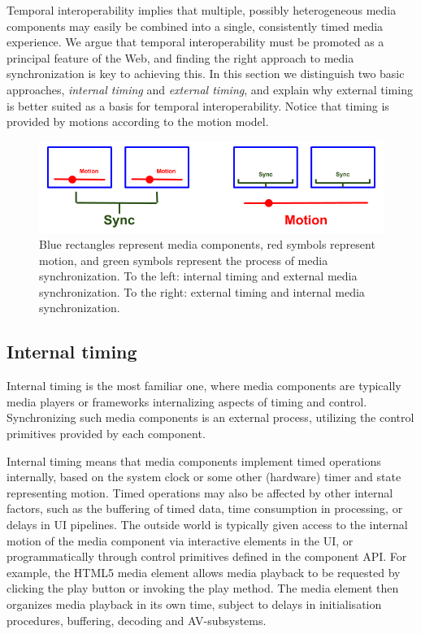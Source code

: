 Temporal interoperability implies that multiple, possibly heterogeneous media
components may easily be combined into a single, consistently timed media
experience. We argue that temporal interoperability must be promoted as a
principal feature of the Web, and finding the right approach to media
synchronization is key to achieving this. In this section we distinguish two
basic approaches, \emph{internal timing} and \emph{external timing}, and
explain why external timing is better suited as a basis for temporal
interoperability. Notice that timing is provided by motions according to the
motion model.

\begin{figure}[h]
\centering
\includegraphics[scale=.4]{fig/internal-external.png}
\caption{
	Blue rectangles represent media components, red symbols represent motion, and green symbols represent the process of media synchronization. To the left: internal timing and external media synchronization. To the right: external timing and internal media synchronization.
}
\label{fig:internalexternal}
\end{figure}


\subsection{Internal timing}

Internal timing is the most familiar one, where media components are typically
media players or frameworks internalizing aspects of timing and control.
Synchronizing such media components is an external process, utilizing the
control primitives provided by each component.

Internal timing means that media components implement timed operations
internally, based on the system clock or some other (hardware) timer and state
representing motion. Timed operations may also be affected by other internal
factors, such as the buffering of timed data, time consumption in processing,
or delays in UI pipelines. The outside world is typically given access to the
internal motion of the media component via interactive elements in the UI, or
programmatically through control primitives defined in the component API. For
example, the HTML5 media element allows media playback to be requested by
clicking the play button or invoking the play method. The media element then
organizes media playback in its own time, subject to delays in initialisation
procedures, buffering, decoding and AV-subsystems.

